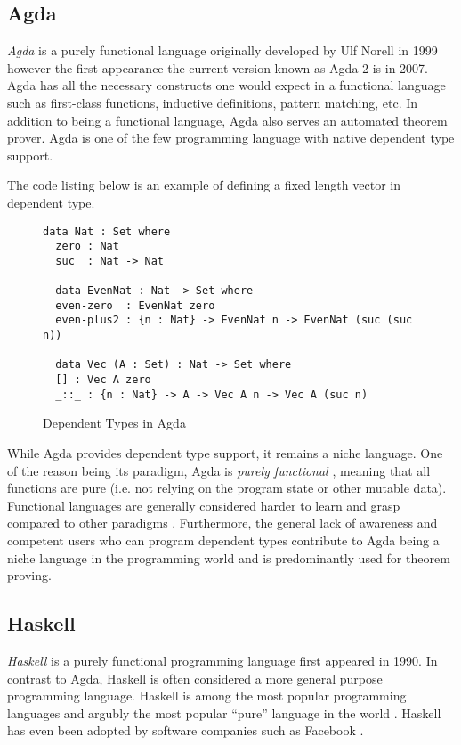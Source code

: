 \documentclass[a4paper,12pt]{report}
\begin{document}
\subsection{Agda}

\textit{Agda} \cite{agda} is a purely functional language originally developed by Ulf Norell in 
1999 however the first appearance the current version known as Agda 2 is in 
2007. Agda has all the necessary constructs one would expect in a functional 
language such as first-class functions, inductive definitions, pattern matching, 
etc. In addition to being a functional language, Agda also serves an automated theorem prover. 
Agda is one of the few programming language with native dependent type support. 

\par
The code listing below is an example of defining a fixed length vector in 
dependent type. 

\begin{figure}[H]
  \begin{lstlisting}[mathescape=true] 
  data Nat : Set where 
  zero : Nat
  suc  : Nat -> Nat  
  
  data EvenNat : Nat -> Set where
  even-zero  : EvenNat zero
  even-plus2 : {n : Nat} -> EvenNat n -> EvenNat (suc (suc n))
  
  data Vec (A : Set) : Nat -> Set where
  [] : Vec A zero
  _::_ : {n : Nat} -> A -> Vec A n -> Vec A (suc n)
  \end{lstlisting}
  \caption{Dependent Types in Agda}
\end{figure}

\par
While Agda provides dependent type support, it remains a niche language. One of 
the reason being its paradigm, Agda is \textit{purely functional} \cite{purelyFP}, meaning that 
all functions are pure (i.e. not relying on the program state or other mutable 
data). Functional languages are generally considered harder to learn and grasp 
compared to other paradigms \cite{fpHarder}. Furthermore, the general lack of 
awareness and competent users who can program dependent types contribute to Agda 
being a niche language in the programming world and is 
predominantly used for theorem proving.

\subsection{Haskell}
\textit{Haskell} \cite{haskell} is a purely functional programming language first appeared in 1990. In 
contrast to Agda, Haskell is often considered a more general purpose programming 
language. Haskell is among the most popular programming languages and argubly 
the most popular ``pure'' language in the world \cite{pypl}. 
Haskell has even been adopted by software companies such as Facebook \cite{haskellFB}.
\end{document}
